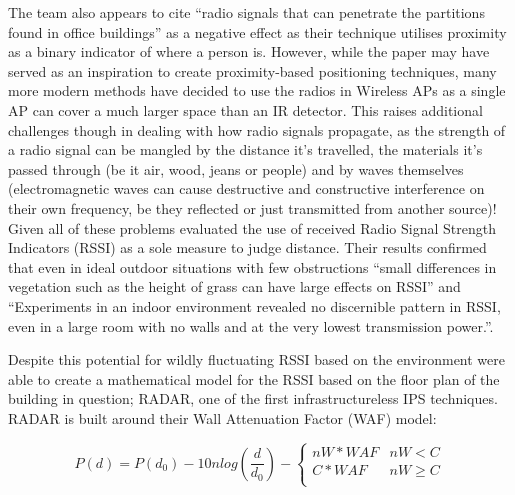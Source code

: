 \documentclass{UoYCSproject}
\begin{document}
                The team also appears to cite ``radio signals that can penetrate the partitions found in office buildings'' as a negative effect as their technique utilises proximity as a binary indicator of where a person is. However, while the paper may have served as an inspiration to create proximity-based positioning techniques, many more modern methods have decided to use the radios in Wireless APs as a single AP can cover a much larger space than an IR detector. This raises additional challenges though in dealing with how radio signals propagate, as the strength of a radio signal can be mangled by the distance it's travelled,  the materials it's passed through (be it air, wood, jeans or people) and by waves themselves (electromagnetic waves can cause destructive and constructive interference on their own frequency, be they reflected or just transmitted from another source)! Given all of these problems \citet{whitehouse2007practical} evaluated the use of received Radio Signal Strength Indicators (RSSI) as a sole measure to judge distance. Their results confirmed that even in ideal outdoor situations with few obstructions ``small differences in vegetation such as the height of grass can have large effects on RSSI'' and ``Experiments in an indoor environment revealed no discernible pattern in RSSI, even in a large room with no walls and at the very lowest transmission power.''.
            
                Despite this potential for wildly fluctuating RSSI based on the environment \citet{bahl2000radar} were able to create a mathematical model for the RSSI based on the floor plan of the building in question; RADAR, one of the first infrastructureless IPS techniques. RADAR is built around their Wall Attenuation Factor (WAF) model:
            
                \begin{equation} \label{eq:WAF}
                    P(d) = P(d_0) - 10nlog\left(\frac{d}{d_0}\right) - \left\lbrace 
                        \begin{matrix}
                            nW * WAF & nW < C \\
                            C * WAF  & nW \geq C \\
                        \end{matrix}
                    \right.
                \end{equation}
            
\end{document}
